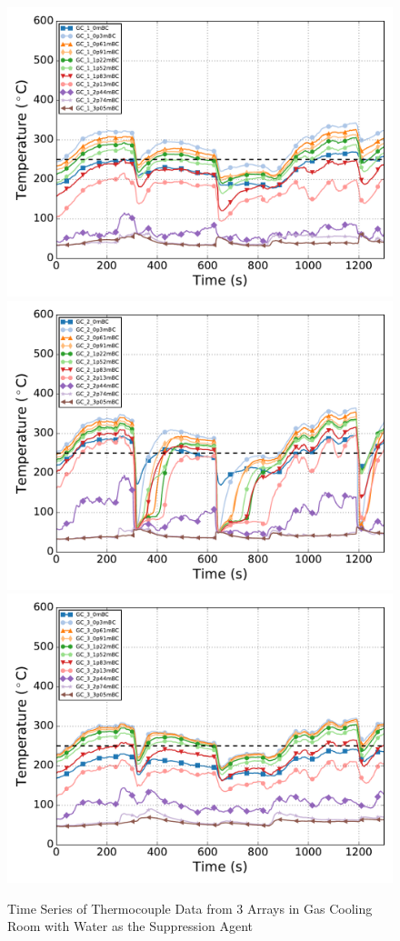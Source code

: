 \documentclass[12pt,oneside]{book}
\begin{document}
\begin{figure}[ht!]
	\includegraphics[width=.5\columnwidth]{../Figures/Gas_Cooling/GCSeries12_TC_A1}
	\includegraphics[width=.5\columnwidth]{../Figures/Gas_Cooling/GCSeries12_TC_A2}
	\includegraphics[width=.5\columnwidth]{../Figures/Gas_Cooling/GCSeries12_TC_A3}
	\caption{Time Series of Thermocouple Data from 3 Arrays in Gas Cooling Room with Water as the Suppression Agent}
	\label{fig:gas_cooling_sub1}
\end{figure}
\end{document}
